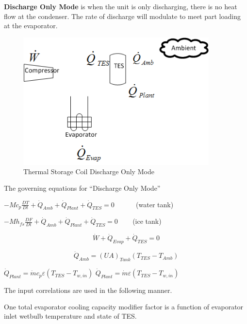 \textbf{Discharge Only Mode} is when the unit is only discharging, there is no heat flow at the condenser. The rate of discharge will modulate to meet part loading at the evaporator.

\begin{figure}[hbtp] %
\centering
\includegraphics[width=0.9\textwidth, height=0.9\textheight, keepaspectratio=true]{media/image4366.png}
\caption{Thermal Storage Coil Discharge Only Mode \protect \label{fig:thermal-storage-coil-discharge-only-mode}}
\end{figure}

The governing equations for ``Discharge Only Mode''

\(- M{c_p}\frac{{DT}}{{Dt}} + {\dot Q_{Amb}} + {\dot Q_{Plant}} + {\dot Q_{TES}} = 0\) ~~~~~ (water tank)

\(- M{h_{fs}}\frac{{DF}}{{Dt}} + {\dot Q_{Amb}} + {\dot Q_{Plant}} + {\dot Q_{TES}} = 0\) ~~~ (ice tank)

\begin{equation}
\dot W + {\dot Q_{Evap}} + {\dot Q_{TES}} = 0
\end{equation}

\begin{equation}
{\dot Q_{Amb}} = {\left( {UA} \right)_{Tank}}\left( {{T_{TES}} - {T_{Amb}}} \right)
\end{equation}

\({\dot Q_{Plant}} = \dot m{c_p}\varepsilon \left( {{T_{TES}} - {T_{w,in}}} \right)\) \({\dot Q_{Plant}} = \dot m\varepsilon \left( {{T_{TES}} - {T_{w,in}}} \right)\)

The input correlations are used in the following manner.

One total evaporator cooling capacity modifier factor is a function of evaporator inlet wetbulb temperature and state of TES.

